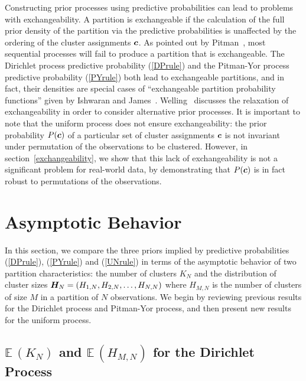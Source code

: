 \documentclass{article}
\begin{document}
Constructing prior processes using predictive probabilities can lead
to problems with exchangeability.  A partition is exchangeable if the
calculation of the full prior density of the partition via the
predictive probabilities is unaffected by the ordering of the cluster
assignments $\boldsymbol{c}$.  As pointed out by Pitman~\cite{Pit02}, most
sequential processes will fail to produce a partition that is
exchangeable.  The Dirichlet process predictive probability
(\ref{DPrule}) and the Pitman-Yor process predictive probability
(\ref{PYrule}) both lead to exchangeable partitions, and in fact,
their densities are special cases of ``exchangeable partition
probability functions'' given by Ishwaran and
James~\cite{IshJam03}. Welling~\cite{Wel06} discusses the relaxation
of exchangeability in order to consider alternative prior processes.
It is important to note that the uniform process does not ensure
exchangeability: the prior probability $P(\boldsymbol{c})$ of a particular set of
cluster assignments $\boldsymbol{c}$ is not invariant under permutation of the
observations to be clustered. However, in
section~\ref{exchangeability}, we show that this lack of
exchangeability is not a significant problem for real-world data, by
demonstrating that $P(\boldsymbol{c})$ is in fact robust to permutations of the
observations.

\section{Asymptotic Behavior}
\label{asymptotics}

In this section, we compare the three priors implied by predictive
probabilities (\ref{DPrule}), (\ref{PYrule}) and (\ref{UNrule}) in
terms of the asymptotic behavior of two partition characteristics: the
number of clusters $K_N$ and the distribution of cluster sizes $\boldsymbol{H}_N
= (H_{1,N}, H_{2,N}, \ldots, H_{N,N})$ where $H_{M,N}$ is the number
of clusters of size $M$ in a partition of $N$ observations.  We begin
by reviewing previous results for the Dirichlet process and Pitman-Yor
process, and then present new results for the uniform process.

\subsection{$\mathbb{E}\,(K_N)$ and $\mathbb{E}\,(H_{M,N})$ for the Dirichlet
  Process} \label{DP_asymptotic}
\end{document}
